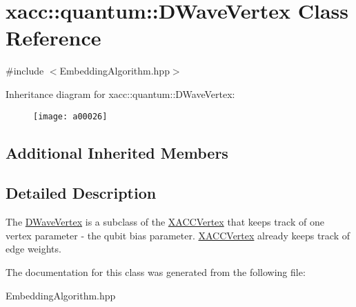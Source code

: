 \hypertarget{a00026}{}\section{xacc\+:\+:quantum\+:\+:D\+Wave\+Vertex Class Reference}
\label{a00026}


{\ttfamily \#include $<$Embedding\+Algorithm.\+hpp$>$}

Inheritance diagram for xacc\+:\+:quantum\+:\+:D\+Wave\+Vertex\+:\begin{figure}[H]
\begin{center}
\leavevmode
\texttt{[image: a00026]}
\end{center}
\end{figure}
\subsection*{Additional Inherited Members}


\subsection{Detailed Description}
The \hyperlink{a00026}{D\+Wave\+Vertex} is a subclass of the \hyperlink{a00073}{X\+A\+C\+C\+Vertex} that keeps track of one vertex parameter -\/ the qubit bias parameter. \hyperlink{a00073}{X\+A\+C\+C\+Vertex} already keeps track of edge weights. 

The documentation for this class was generated from the following file\+:\begin{DoxyCompactItemize}
\item 
Embedding\+Algorithm.\+hpp\end{DoxyCompactItemize}
